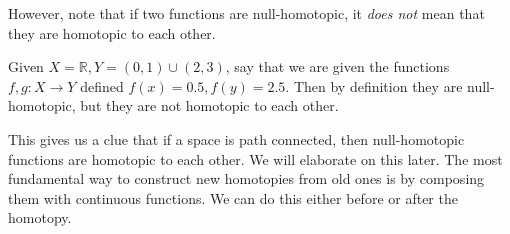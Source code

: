   However, note that if two functions are null-homotopic, it \textit{does not} mean that they are homotopic to each other. 

  \begin{example}
    Given $X = \mathbb{R}, Y = (0, 1) \cup (2, 3)$, say that we are given the functions $f, g: X \to Y$ defined $f(x) = 0.5, f(y) = 2.5$. Then by definition they are null-homotopic, but they are not homotopic to each other. 
  \end{example}

  This gives us a clue that if a space is path connected, then null-homotopic functions are homotopic to each other. We will elaborate on this later. The most fundamental way to construct new homotopies from old ones is by composing them with continuous functions. We can do this either before or after the homotopy. 

